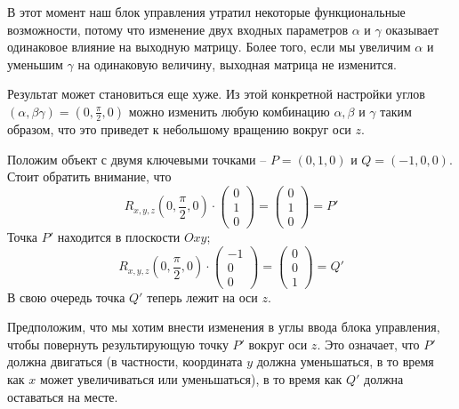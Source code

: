 \documentclass[fleqn]{extarticle}
\begin{document}
	В этот момент наш блок управления утратил некоторые функциональные возможности, 
	потому что изменение двух входных параметров $\alpha$ и $\gamma$ оказывает одинаковое влияние на выходную матрицу. 
	Более того, если мы увеличим $\alpha$ и уменьшим $\gamma$ на одинаковую величину, выходная матрица не изменится.

	Результат может становиться еще хуже. Из этой конкретной настройки углов
	$\left(\alpha, \beta \gamma \right) = \left(0, \frac{\pi}{2}, 0 \right)$ 
	можно изменить любую комбинацию $\alpha, \beta$ и $\gamma$ таким образом, 
	что это приведет к небольшому вращению вокруг оси $z$.

	Положим объект с двумя ключевыми точками -- $P = (0, 1, 0)$ и $Q = (-1, 0, 0)$. Стоит обратить внимание, что 
	\[ R_{x, y, z}\left(0, \frac{\pi}{2}, 0 \right) \cdot \begin{pmatrix} 0 \\ 1 \\ 0 \end{pmatrix} = \begin{pmatrix} 0 \\ 1 \\ 0 \end{pmatrix} = P' \] 
	Точка $P'$ находится в плоскости $Oxy$;
	\[ R_{x, y, z}\left(0, \frac{\pi}{2}, 0 \right) \cdot \begin{pmatrix} -1 \\ 0 \\ 0 \end{pmatrix} = \begin{pmatrix} 0 \\ 0 \\ 1 \end{pmatrix} = Q' \]
	В свою очередь точка $Q'$ теперь лежит на оси $z$.

	Предположим, что мы хотим внести изменения в углы ввода блока управления, 
	чтобы повернуть результирующую точку $P'$ вокруг оси $z$. Это означает, что $P'$ должна двигаться 
	(в частности, координата $y$ должна уменьшаться, в то время как $x$ может увеличиваться или уменьшаться), 
	в то время как $Q'$ должна оставаться на месте.
\end{document}
